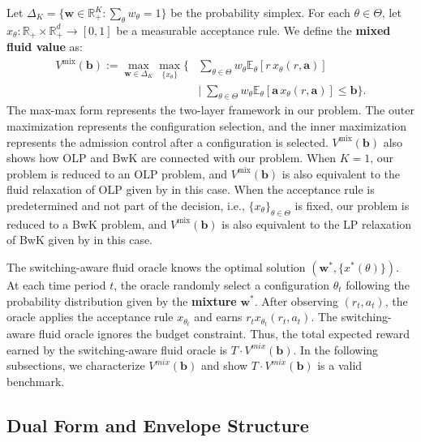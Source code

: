 \documentclass[11pt]{article}
\newcommand{\bb}{\mathbf{b}}
\newcommand{\ba}{\mathbf{a}}
\newcommand{\bw}{\mathbf{w}}
\newcommand{\E}{\mathbb{E}}
\newcommand{\R}{\mathbb{R}}
\begin{document}
Let $\Delta_K = \{\bw \in \R^K_+ : \sum_\theta w_\theta = 1\}$ be the probability simplex. For each $\theta\in\Theta$, let $x_\theta : \R_+ \times \R^d_+ \to [0, 1]$ be a measurable acceptance rule. We define the \textbf{mixed fluid value} as:
\begin{equation}
\label{eq:mix-primal}
\begin{split}
V^{\mathrm{mix}}(\bb) := \max_{\bw \in \Delta_K} \max_{\{x_\theta\}} \Big\{ & \sum_{\theta \in \Theta} w_\theta \E_\theta[r\,x_\theta(r, \ba)] \\
& \Big|\; \sum_{\theta \in \Theta} w_\theta \E_\theta[\ba\,x_\theta(r, \ba)] \le \bb \Big\}.
\end{split}
\end{equation}
The max-max form represents the two-layer framework in our problem. The outer maximization represents the configuration selection, and the inner maximization represents the admission control after a configuration is selected. $V^{\mathrm{mix}}(\bb)$ also shows how OLP and BwK are connected with our problem. When $K=1$, our problem is reduced to an OLP problem, and $V^{\mathrm{mix}}(\bb)$ is also equivalent to the fluid relaxation of OLP given by \citep{Chen2024} in this case. When the acceptance rule is predetermined and not part of the decision, i.e., $\{x_{\theta}\}_{\theta\in\Theta}$ is fixed, our problem is reduced to a BwK problem, and $V^{\mathrm{mix}}(\bb)$ is also equivalent to the LP relaxation of BwK given by \citep{badanidiyuru2018bandits} in this case.

\quad The switching-aware fluid oracle knows the optimal solution $(\bw^*,\{x^*(\theta)\})$. At each time period $t$, the oracle randomly select a configuration $\theta_t$ following the probability distribution given by the \textbf{mixture} $\bw^*$. After observing $(r_t,a_t)$, the oracle applies the acceptance rule $x_{\theta_t}$ and earns $r_tx_{\theta_t}(r_t,a_t)$. The switching-aware fluid oracle ignores the budget constraint. Thus, the total expected reward earned by the switching-aware fluid oracle is $T\cdot V^{mix}(\bb)$. In the following subsections, we characterize $V^{mix}(\bb)$ and show $T\cdot V^{mix}(\bb)$ is a valid benchmark.
\subsection{Dual Form and Envelope Structure}
\end{document}
